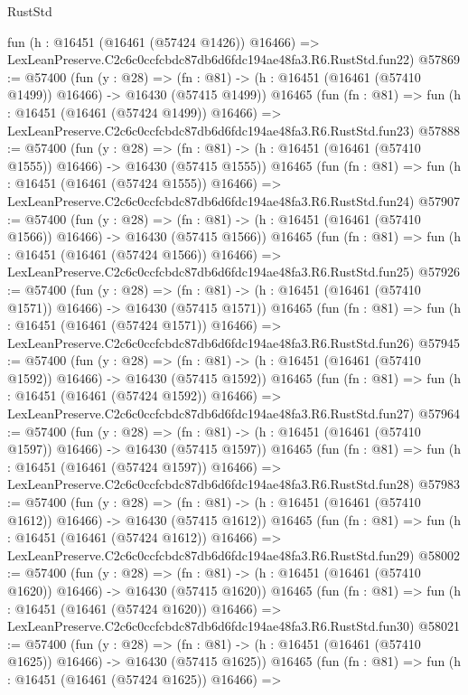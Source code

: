 \begin{lexlean}{RustStd}
\begin{coremodule}
    fun (h : @16451 (@16461 (@57424 @1426)) @16466) =>
    LexLeanPreserve.C2c6c0ccfcbdc87db6d6fdc194ae48fa3.R6.RustStd.fun22)
@57869 := @57400
    (fun (y : @28) =>
    (fn : @81) -> (h : @16451 (@16461 (@57410 @1499)) @16466) -> @16430 (@57415 @1499))
    @16465
    (fun (fn : @81) =>
    fun (h : @16451 (@16461 (@57424 @1499)) @16466) =>
    LexLeanPreserve.C2c6c0ccfcbdc87db6d6fdc194ae48fa3.R6.RustStd.fun23)
@57888 := @57400
    (fun (y : @28) =>
    (fn : @81) -> (h : @16451 (@16461 (@57410 @1555)) @16466) -> @16430 (@57415 @1555))
    @16465
    (fun (fn : @81) =>
    fun (h : @16451 (@16461 (@57424 @1555)) @16466) =>
    LexLeanPreserve.C2c6c0ccfcbdc87db6d6fdc194ae48fa3.R6.RustStd.fun24)
@57907 := @57400
    (fun (y : @28) =>
    (fn : @81) -> (h : @16451 (@16461 (@57410 @1566)) @16466) -> @16430 (@57415 @1566))
    @16465
    (fun (fn : @81) =>
    fun (h : @16451 (@16461 (@57424 @1566)) @16466) =>
    LexLeanPreserve.C2c6c0ccfcbdc87db6d6fdc194ae48fa3.R6.RustStd.fun25)
@57926 := @57400
    (fun (y : @28) =>
    (fn : @81) -> (h : @16451 (@16461 (@57410 @1571)) @16466) -> @16430 (@57415 @1571))
    @16465
    (fun (fn : @81) =>
    fun (h : @16451 (@16461 (@57424 @1571)) @16466) =>
    LexLeanPreserve.C2c6c0ccfcbdc87db6d6fdc194ae48fa3.R6.RustStd.fun26)
@57945 := @57400
    (fun (y : @28) =>
    (fn : @81) -> (h : @16451 (@16461 (@57410 @1592)) @16466) -> @16430 (@57415 @1592))
    @16465
    (fun (fn : @81) =>
    fun (h : @16451 (@16461 (@57424 @1592)) @16466) =>
    LexLeanPreserve.C2c6c0ccfcbdc87db6d6fdc194ae48fa3.R6.RustStd.fun27)
@57964 := @57400
    (fun (y : @28) =>
    (fn : @81) -> (h : @16451 (@16461 (@57410 @1597)) @16466) -> @16430 (@57415 @1597))
    @16465
    (fun (fn : @81) =>
    fun (h : @16451 (@16461 (@57424 @1597)) @16466) =>
    LexLeanPreserve.C2c6c0ccfcbdc87db6d6fdc194ae48fa3.R6.RustStd.fun28)
@57983 := @57400
    (fun (y : @28) =>
    (fn : @81) -> (h : @16451 (@16461 (@57410 @1612)) @16466) -> @16430 (@57415 @1612))
    @16465
    (fun (fn : @81) =>
    fun (h : @16451 (@16461 (@57424 @1612)) @16466) =>
    LexLeanPreserve.C2c6c0ccfcbdc87db6d6fdc194ae48fa3.R6.RustStd.fun29)
@58002 := @57400
    (fun (y : @28) =>
    (fn : @81) -> (h : @16451 (@16461 (@57410 @1620)) @16466) -> @16430 (@57415 @1620))
    @16465
    (fun (fn : @81) =>
    fun (h : @16451 (@16461 (@57424 @1620)) @16466) =>
    LexLeanPreserve.C2c6c0ccfcbdc87db6d6fdc194ae48fa3.R6.RustStd.fun30)
@58021 := @57400
    (fun (y : @28) =>
    (fn : @81) -> (h : @16451 (@16461 (@57410 @1625)) @16466) -> @16430 (@57415 @1625))
    @16465
    (fun (fn : @81) =>
    fun (h : @16451 (@16461 (@57424 @1625)) @16466) =>

\end{coremodule}
\end{lexlean}
